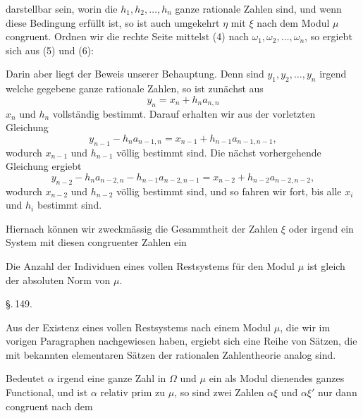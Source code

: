 darstellbar sein, worin die $h_1, h_2, \ldots, h_n$ ganze rationale Zahlen
sind, und wenn diese Bedingung erfüllt ist, so ist auch umgekehrt $\eta$
mit $\xi$ nach dem Modul $\mu$ congruent. Ordnen wir die rechte Seite
mittelst (4) nach $\omega_1, \omega_2, \ldots, \omega_n$, so ergiebt sich
aus (5) und (6):

Darin aber liegt der Beweis unserer Behauptung. Denn sind $y_1, y_2,
\ldots, y_n$ irgend welche gegebene ganze rationale Zahlen, so ist
zunächst aus
\[
y_n = x_n + h_na_{n,n}
\]
$x_n$ und $h_n$ vollständig bestimmt. Darauf erhalten wir aus der
vorletzten Gleichung
\[
y_{n-1} - h_na_{n-1,n} = x_{n-1} + h_{n-1}a_{n-1,n-1},
\]
wodurch $x_{n-1}$ und $h_{n-1}$ völlig bestimmt sind. Die nächst
vorhergehende Gleichung ergiebt
\[
y_{n-2} - h_na_{n-2,n} - h_{n-1}a_{n-2,n-1} = x_{n-2} + h_{n-2}a_{n-2,n-2},
\]
wodurch $x_{n-2}$ und $h_{n-2}$ völlig bestimmt sind, und so fahren wir
fort, bis alle $x_i$ und $h_i$ bestimmt sind.

Hiernach können wir zweckmässig die Gesammtheit der Zahlen $\xi$ oder
irgend ein System mit diesen congruenter Zahlen ein 

Die Anzahl der Individuen eines vollen Restsystems für den Modul $\mu$
ist gleich der absoluten Norm von $\mu$.

\begin{center}
\S.\,149.

\end{center}

Aus der Existenz eines vollen Restsystems nach einem Modul $\mu$, die
wir im vorigen Paragraphen nachgewiesen haben, ergiebt sich eine Reihe
von Sätzen, die mit bekannten elementaren Sätzen der rationalen
Zahlentheorie analog sind.

Bedeutet $\alpha$ irgend eine ganze Zahl in $\Omega$ und $\mu$ ein als
Modul dienendes ganzes Functional, und ist $\alpha$ relativ prim zu
$\mu$, so sind zwei Zahlen $\alpha\xi$ und $\alpha\xi'$ nur dann
congruent nach dem
